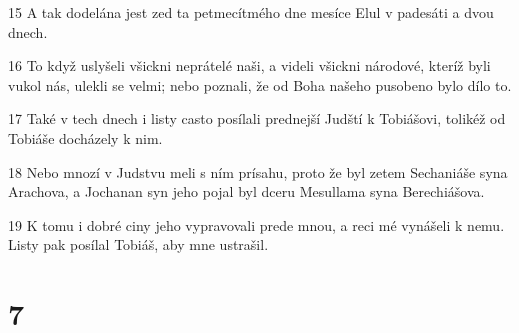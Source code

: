 \par 15 A tak dodelána jest zed ta petmecítmého dne mesíce Elul v padesáti a dvou dnech.
\par 16 To když uslyšeli všickni neprátelé naši, a videli všickni národové, kteríž byli vukol nás, ulekli se velmi; nebo poznali, že od Boha našeho pusobeno bylo dílo to.
\par 17 Také v tech dnech i listy casto posílali prednejší Judští k Tobiášovi, tolikéž od Tobiáše docházely k nim.
\par 18 Nebo mnozí v Judstvu meli s ním prísahu, proto že byl zetem Sechaniáše syna Arachova, a Jochanan syn jeho pojal byl dceru Mesullama syna Berechiášova.
\par 19 K tomu i dobré ciny jeho vypravovali prede mnou, a reci mé vynášeli k nemu. Listy pak posílal Tobiáš, aby mne ustrašil.

\chapter{7}

